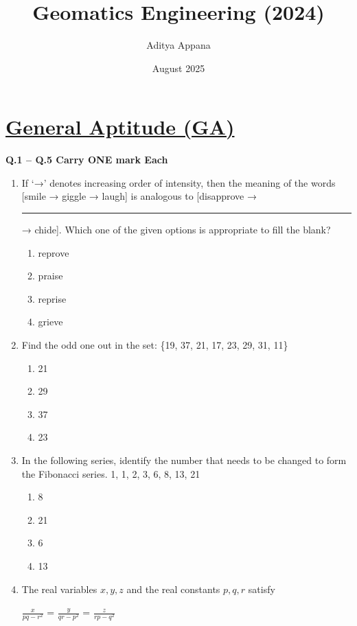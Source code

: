 \documentclass[12pt]{article}
\title{Geomatics Engineering (2024)}
\author{Aditya Appana}
\date{August 2025}
\begin{document}
\maketitle

\section*{\underline{General Aptitude (GA)}}

\textbf{Q.1 – Q.5 Carry ONE mark Each}

\begin{enumerate}

\item If ‘→’ denotes increasing order of intensity, then the meaning of the words [smile → giggle → laugh] is analogous to [disapprove → \rule{1.5cm}{0.15mm} → chide]. Which one of the given options is appropriate to fill the blank?
\begin{enumerate}
    

   \item reprove  
   \item praise  
   \item reprise  
   \item grieve  
    
\end{enumerate}

\item Find the odd one out in the set: \{19, 37, 21, 17, 23, 29, 31, 11\}

\begin{enumerate}
    \item 21  
   \item 29  
   \item 37  
   \item 23  
\end{enumerate}

\item In the following series, identify the number that needs to be changed to form the
Fibonacci series. 1, 1, 2, 3, 6, 8, 13, 21  

\begin{enumerate}
    \item8 
   \item 21 
   \item 6  
   \item 13 
\end{enumerate}


\item The real variables $x,y,z$ and the real constants $p,q,r$ satisfy  \\   \begin{Large} $\frac{x}{pq-r^2}$ =     $\frac{y}{qr-p^2}$ = $\frac{z}{rp-q^2}$ \end{Large}


\end{enumerate}
\end{document}
